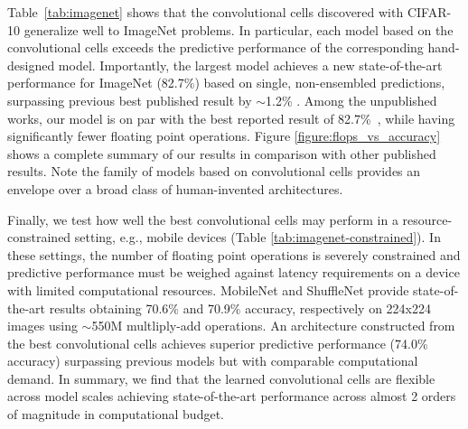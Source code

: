 


Table~\ref{tab:imagenet} shows that the convolutional cells discovered with CIFAR-10 generalize well to ImageNet problems.
In particular, each model based on the convolutional cells exceeds the predictive performance of the corresponding hand-designed model.
Importantly, the largest model achieves a new state-of-the-art performance for ImageNet (82.7\%) based on single, non-ensembled predictions, surpassing previous best published result by $\sim$1.2\% \cite{dualpath}. Among the unpublished works, our model is on par with the best reported result of 82.7\%~\cite{hu2017squeeze}, while having significantly fewer floating point operations.
Figure \ref{figure:flops_vs_accuracy} shows a complete summary of our results in comparison with other published results. Note the family of models based on convolutional cells provides an envelope over a broad class of human-invented architectures.


Finally, we test how well the best convolutional cells may perform in a resource-constrained setting, e.g.,  mobile devices (Table \ref{tab:imagenet-constrained}). In these settings, the number of floating point operations is severely constrained and predictive performance must be weighed against latency requirements on a device with limited computational resources. MobileNet \cite{howard2017mobilenets} and ShuffleNet \cite{shufflenet} provide state-of-the-art results obtaining 70.6\% and 70.9$\%$ accuracy, respectively on 224x224 images using $\sim$550M multliply-add operations. An architecture constructed from the best convolutional cells  achieves superior predictive performance (74.0\% accuracy) surpassing previous models but with comparable computational demand. In summary, we find that the learned convolutional cells are flexible across model scales achieving state-of-the-art performance across almost 2 orders of magnitude in computational budget.

